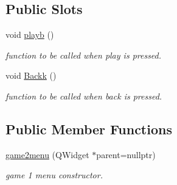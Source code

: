 \subsection*{Public Slots}
\begin{DoxyCompactItemize}
\item 
void \hyperlink{classgame2menu_a329e5585c0d5c6af4c4f4011efa6878f}{playb} ()
\begin{DoxyCompactList}\small\item\em function to be called when play is pressed. \end{DoxyCompactList}\item 
void \hyperlink{classgame2menu_a095e776799d92c9d6cb05aa49b63472a}{Backk} ()
\begin{DoxyCompactList}\small\item\em function to be called when back is pressed. \end{DoxyCompactList}\end{DoxyCompactItemize}
\subsection*{Public Member Functions}
\begin{DoxyCompactItemize}
\item 
\hyperlink{classgame2menu_adbca99dd8b328bab30bb1a5f198cb849}{game2menu} (Q\+Widget $\ast$parent=nullptr)
\begin{DoxyCompactList}\small\item\em game 1 menu constructor. \end{DoxyCompactList}\end{DoxyCompactItemize}
